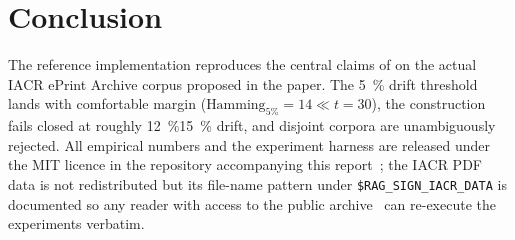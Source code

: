 \section{Conclusion}
\label{sec:conclusion}

The reference implementation reproduces the central claims of
\cite{holmes2025ragsign} on the actual IACR ePrint Archive corpus
proposed in the paper.  The \SI{5}{\percent} drift threshold lands
with comfortable margin
($\text{Hamming}_{5\%} = 14 \ll t = 30$), the construction
fails closed at roughly \SI{12}{\percent}\textendash\SI{15}{\percent}
drift, and disjoint corpora are unambiguously rejected.  All empirical numbers and the experiment harness are released under
the MIT licence in the repository accompanying this report~\cite{ragsign-impl};
the IACR PDF data is not redistributed but its file\nobreakdash-name
pattern under \texttt{\$RAG\_SIGN\_IACR\_DATA} is documented so any
reader with access to the public archive~\cite{iacr-eprint} can
re\nobreakdash-execute the experiments verbatim.





